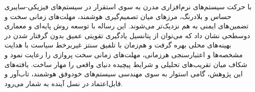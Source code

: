 \documentclass[oneside,openany,phd]{TMU-Thesis}
\begin{document}
با حرکت سیستم‌های نرم‌افزاری مدرن به سوی استقرار در سیستم‌های فیزیکی-سایبری حساس و بلادرنگ، مرزهای میان تصمیم‌گیری هوشمند، مهلت‌های زمانی سخت و تضمین‌های ایمنی به هم نزدیک‌تر می‌شوند. این رساله با توسعه روش پایه‌ای  و معماری دوسطحی \rsdrlplus نشان داد که می‌توان از پتانسیل یادگیری تقویتی عمیق بدون گرفتار شدن در بهینه‌های محلی بهره گرفت و هم‌زمان با تلفیق سنتز غیربرخط سیاست با هدایت مشخصه‌ها و اعتبارسنجی هرزمانی، مهلت‌های زمانی سخت پروازی را رعایت نمود و شکاف میان تقریب‌های تحلیلی و شرایط پیچیده دنیای واقعی را مهار ساخت. یافته‌های این پژوهش، گامی استوار به سوی مهندسی سیستم‌های خودوفق هوشمند، تاب‌آور و قابل‌اعتماد در نسل آینده به شمار می‌رود.
\newpage




\ifstandalone


\fi
\end{document}
